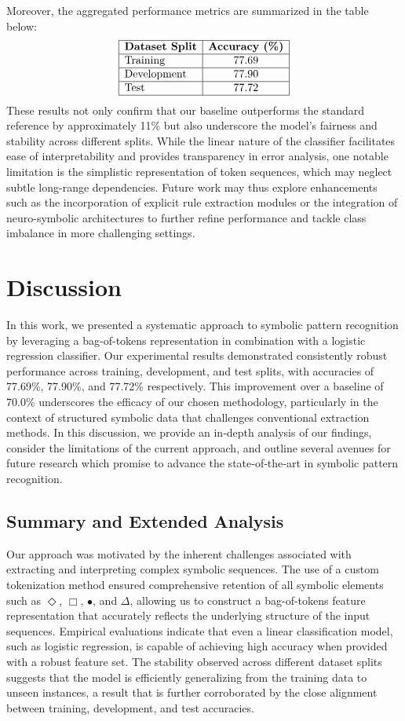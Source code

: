 \documentclass{article}
\begin{document}
Moreover, the aggregated performance metrics are summarized in the table below:
\[
\begin{array}{|l|c|}
\hline
\textbf{Dataset Split} & \textbf{Accuracy (\%)} \\
\hline
\text{Training} & 77.69 \\
\hline
\text{Development} & 77.90 \\
\hline
\text{Test} & 77.72 \\
\hline
\end{array}
\]
These results not only confirm that our baseline outperforms the standard reference by approximately 11\% but also underscore the model's fairness and stability across different splits. While the linear nature of the classifier facilitates ease of interpretability and provides transparency in error analysis, one notable limitation is the simplistic representation of token sequences, which may neglect subtle long-range dependencies. Future work may thus explore enhancements such as the incorporation of explicit rule extraction modules or the integration of neuro-symbolic architectures to further refine performance and tackle class imbalance in more challenging settings.

\section{Discussion}
In this work, we presented a systematic approach to symbolic pattern recognition by leveraging a bag-of-tokens representation in combination with a logistic regression classifier. Our experimental results demonstrated consistently robust performance across training, development, and test splits, with accuracies of 77.69\%, 77.90\%, and 77.72\% respectively. This improvement over a baseline of 70.0\% underscores the efficacy of our chosen methodology, particularly in the context of structured symbolic data that challenges conventional extraction methods. In this discussion, we provide an in‐depth analysis of our findings, consider the limitations of the current approach, and outline several avenues for future research which promise to advance the state‐of‐the‐art in symbolic pattern recognition.

\subsection*{Summary and Extended Analysis}
Our approach was motivated by the inherent challenges associated with extracting and interpreting complex symbolic sequences. The use of a custom tokenization method ensured comprehensive retention of all symbolic elements such as \(\Diamond\), \(\Box\), \(\bullet\), and \(\Delta\), allowing us to construct a bag-of-tokens feature representation that accurately reflects the underlying structure of the input sequences. Empirical evaluations indicate that even a linear classification model, such as logistic regression, is capable of achieving high accuracy when provided with a robust feature set. The stability observed across different dataset splits suggests that the model is efficiently generalizing from the training data to unseen instances, a result that is further corroborated by the close alignment between training, development, and test accuracies.
\end{document}
